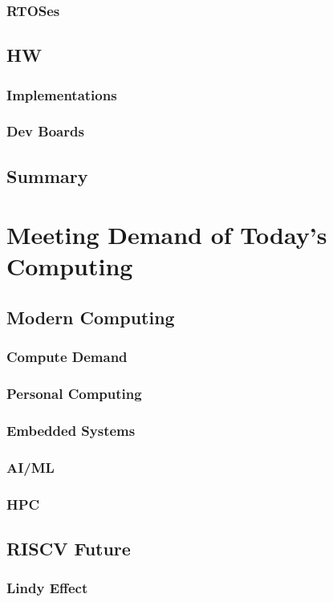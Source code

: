 \documentclass[10pt,a4paper]{article}
\begin{document}
      \subsubsection{RTOSes}
    \subsection{HW}
      \subsubsection{Implementations}
      \subsubsection{Dev Boards}
    \subsection{Summary}
\section{Meeting Demand of Today's Computing}
    \subsection{Modern Computing}
      \subsubsection{Compute Demand}
      \subsubsection{Personal Computing}
      \subsubsection{Embedded Systems}
      \subsubsection{AI/ML}
      \subsubsection{HPC}
    \subsection{RISCV Future}
      \subsubsection{Lindy Effect}
\end{document}
